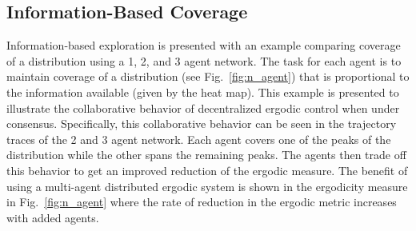 \documentclass[letterpaper, 10 pt,  conference, twoside]{IEEEtran/IEEEtran}
\theoremstyle{definition}
\begin{document}
\subsection{Information-Based Coverage}

Information-based exploration is presented with an example comparing coverage of a distribution using a 1, 2, and 3 agent network. The task for each agent is to maintain coverage of a distribution (see Fig.~\ref{fig:n_agent}) that is proportional to the information available (given by the heat map). This example is presented to illustrate the collaborative behavior of decentralized ergodic control when under consensus. Specifically, this collaborative behavior can be seen in the trajectory traces of the 2 and 3 agent network. Each agent covers one of the peaks of the distribution while the other spans the remaining peaks. The agents then trade off this behavior to get an improved reduction of the ergodic measure. The benefit of using a multi-agent distributed ergodic system is shown in the ergodicity measure in Fig.~\ref{fig:n_agent} where the rate of reduction in the ergodic metric increases with added agents.
\end{document}
